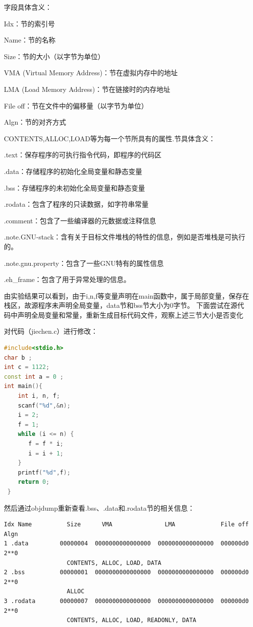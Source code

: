 \documentclass[UTF8,a4paper,10pt]{ctexart}
\begin{document}
字段具体含义：\par
Idx：节的索引号\par
Name：节的名称\par
Size：节的大小（以字节为单位）\par
VMA (Virtual Memory Address)：节在虚拟内存中的地址\par
LMA (Load Memory Address)：节在链接时的内存地址\par
File off：节在文件中的偏移量（以字节为单位）\par
Algn：节的对齐方式\par
CONTENTS,ALLOC,LOAD等为每一个节所具有的属性.节具体含义：\par
.text：保存程序的可执行指令代码，即程序的代码区\par
.data：存储程序的初始化全局变量和静态变量\par
.bss：存储程序的未初始化全局变量和静态变量\par
.rodata：包含了程序的只读数据，如字符串常量\par
.comment：包含了一些编译器的元数据或注释信息\par
.note.GNU-stack：含有关于目标文件堆栈的特性的信息，例如是否堆栈是可执行的。\par
.note.gnu.property：包含了一些GNU特有的属性信息\par
.eh\_frame：包含了用于异常处理的信息。\par
由实验结果可以看到，由于i,n,f等变量声明在main函数中，属于局部变量，保存在栈区，故源程序未声明全局变量，data节和bss节大小为0字节。
下面尝试在源代码中声明全局变量和常量，重新生成目标代码文件，观察上述三节大小是否变化\par
对代码（jiechen.c）进行修改：
\begin{lstlisting}[title=阶乘,frame=trbl,language={C++}]
#include<stdio.h>
char b ;
int c = 1122;
const int a = 0 ;
int main(){
    int i, n, f;
    scanf("%d",&n);
    i = 2;
    f = 1;
    while (i <= n) {
       f = f * i;
       i = i + 1;
    }
    printf("%d",f);
    return 0;
 }
\end{lstlisting}
然后通过objdump重新查看.bss、.data和.rodata节的相关信息：
\begin{lstlisting}[frame=trbl]
Idx Name          Size      VMA               LMA             File off  Algn
1 .data         00000004  0000000000000000  0000000000000000  000000d0  2**0
                  CONTENTS, ALLOC, LOAD, DATA
2 .bss          00000001  0000000000000000  0000000000000000  000000d0  2**0
                  ALLOC
3 .rodata       00000007  0000000000000000  0000000000000000  000000d0  2**0
                  CONTENTS, ALLOC, LOAD, READONLY, DATA
\end{lstlisting}\par
\end{document}

